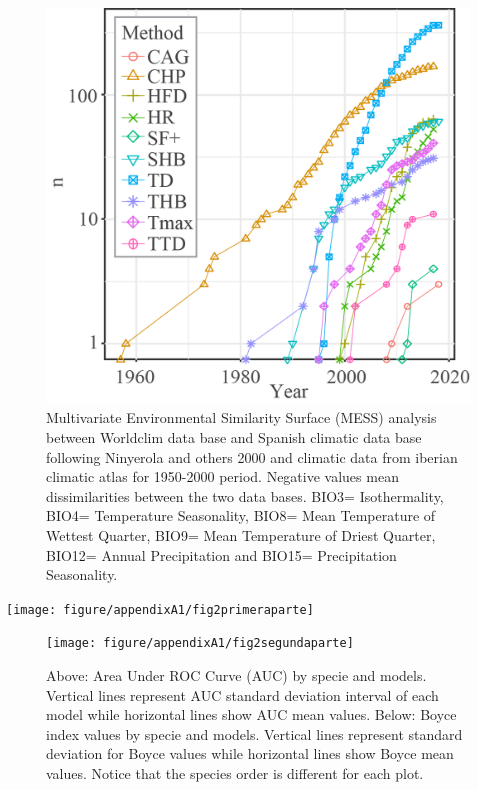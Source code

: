 \documentclass[11pt,twoside]{reedthesis}
\begin{document}
\newpage
\begin{landscape}
\setlength{\abovecaptionskip}{15pt}
\begin{figure}[hbt!]

{\centering \includegraphics[width=0.9\linewidth]{figure/appendixA1/fig1} 

}

\caption[Multivariate Environmental Similarity Surface (MESS) analyses ninyerola vs worlclim methods]{ Multivariate Environmental Similarity Surface (MESS) analysis between Worldclim data base and Spanish climatic data base following  Ninyerola and others 2000 and climatic data from iberian climatic atlas for 1950-2000 period. Negative values mean dissimilarities between the two data bases. BIO3= Isothermality, BIO4= Temperature Seasonality, BIO8= Mean Temperature of Wettest Quarter, BIO9= Mean Temperature of Driest Quarter, BIO12= Annual Precipitation and BIO15= Precipitation Seasonality.}\label{fig:apa11}
\end{figure}
\setlength{\abovecaptionskip}{0pt}
\newpage
\end{landscape}
\begin{center}\texttt{[image: figure/appendixA1/fig2primeraparte]} \end{center}

\setlength{\textfloatsep}{-10pt plus 1.0pt minus 2.0pt}

\setlength{\abovecaptionskip}{15pt}
\begin{figure}[hbt!]

{\centering \texttt{[image: figure/appendixA1/fig2segundaparte]} 

}

\caption[ AUC and Boyce index per species]{ Above: Area Under ROC Curve (AUC) by specie and models. Vertical lines represent AUC standard deviation interval of each model while horizontal lines show AUC mean values. Below: Boyce index values by specie and models. Vertical lines represent standard deviation for Boyce values while horizontal lines show Boyce mean values. Notice that the species order is different for each plot.}\label{fig:apa122}
\end{figure}
\setlength{\abovecaptionskip}{0pt}
\end{document}
